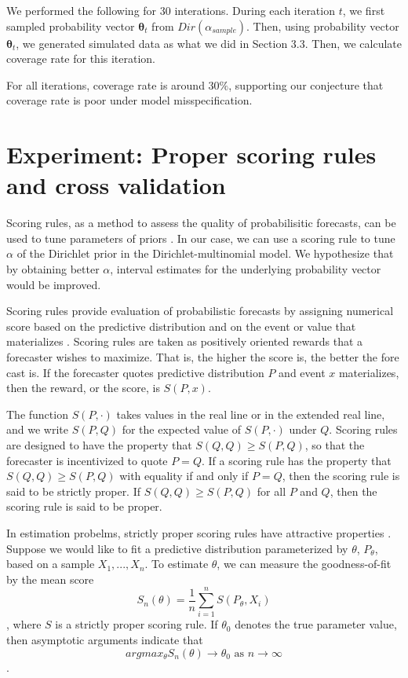 \documentclass{article}
\begin{document}
We performed the following for 30 interations. During each iteration $t$, we first sampled probability vector $\boldsymbol{\theta}_t$ from $Dir(\alpha_{sample})$. Then, using probability vector $\boldsymbol{\theta}_t$, we generated simulated data as what we did in Section 3.3. Then, we calculate coverage rate for this iteration.

For all iterations, coverage rate is around $30\%$, supporting our conjecture that coverage rate is poor under model misspecification.



\section{Experiment: Proper scoring rules and cross validation}

Scoring rules, as a method to assess the quality of probabilisitic forecasts, can be used to tune parameters of priors \cite{gneiting2007strictly}. In our case, we can use a scoring rule to tune $\alpha$ of the Dirichlet prior in the Dirichlet-multinomial model. We hypothesize that by obtaining better $\alpha$, interval estimates for the underlying probability vector would be improved.

Scoring rules provide evaluation of probabilistic forecasts by assigning numerical score based on the predictive distribution and on the event or value that materializes \cite{gneiting2007strictly}. Scoring rules are taken as positively oriented rewards that a forecaster wishes to maximize. That is, the higher the score is, the better the fore cast is. If the forecaster quotes predictive distribution $P$ and event $x$ materializes, then the reward, or the score, is $S(P, x)$.

The function $S(P, \cdot)$ takes values in the real line or in the extended real line, and we write $S(P, Q)$ for the expected value of $S(P, \cdot)$ under $Q$. Scoring rules are designed to have the property that $S(Q, Q) \geq S(P, Q)$, so that the forecaster is incentivized to quote $P = Q$. If a scoring rule has the property that $S(Q, Q) \geq S(P, Q)$ with equality if and only if $P = Q$, then the scoring rule is said to be strictly proper. If $S(Q, Q) \geq S(P, Q)$ for all $P$ and $Q$, then the scoring rule is said to be proper.

In estimation probelms, strictly proper scoring rules have attractive properties \cite{gneiting2007strictly}. Suppose we would like to fit a predictive distribution parameterized by $\theta$, $P_{\theta}$, based on a sample $X_1, ..., X_n$. To estimate $\theta$, we can measure the goodness-of-fit by the mean score $$S_{n} (\theta) = \frac{1}{n} \sum_{i = 1}^n S(P_{\theta}, X_i)$$, where $S$ is a strictly proper scoring rule. If $\theta_0$ denotes the true parameter value, then asymptotic arguments indicate that $$arg max_{\theta} S_n(\theta) \rightarrow \theta_0 \text{ as } n \rightarrow \infty$$.
\end{document}
